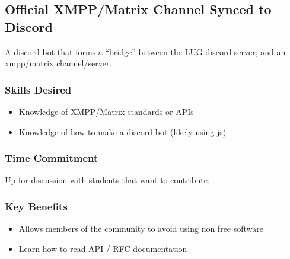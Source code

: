 \subsection{Official XMPP/Matrix Channel Synced to Discord}

A discord bot that forms a ``bridge'' between the LUG discord server, and an xmpp/matrix channel/server.

\subsubsection*{Skills Desired}

\begin{itemize}
\item Knowledge of XMPP/Matrix standards or APIs
\item Knowledge of how to make a discord bot (likely using js)
\end{itemize}

\subsubsection*{Time Commitment}

Up for discussion with students that want to contribute.

\subsubsection*{Key Benefits}

\begin{itemize}
\item Allows members of the community to avoid using non free software
\item Learn how to read API / RFC documentation
\end{itemize}


